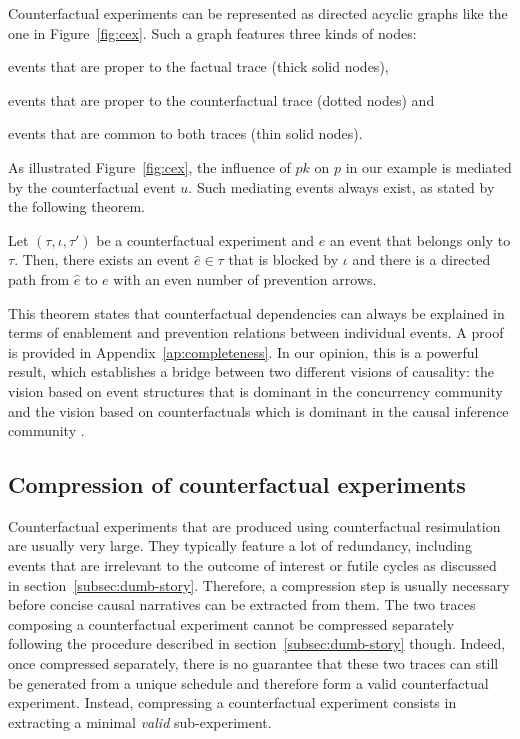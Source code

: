 Counterfactual experiments can be represented as directed acyclic
graphs like the one in Figure~\ref{fig:cex}. Such a graph features
three kinds of nodes:
\begin{inparaenum}[]
\item events that are proper to the factual trace (thick solid nodes),
\item events that are proper to the counterfactual trace (dotted
  nodes) and
\item events that are common to both traces (thin solid nodes).
\end{inparaenum}


As illustrated Figure~\ref{fig:cex}, the influence of $pk$ on $p$ in
our example is mediated by the counterfactual event $u$. Such
mediating events always exist, as stated by the following theorem.

\begin{theorem}
  \label{thm:completeness}
  Let $(\tau, \iota, \tau')$ be a counterfactual experiment and $e$ an
  event that belongs only to $\tau$. Then, there exists an event
  $\hat e \in \tau$ that is blocked by $\iota$ and there is a directed
  path from $\hat e$ to $e$ with an even number of prevention arrows.
\end{theorem}
\noindent This theorem states that counterfactual dependencies can
always be explained in terms of enablement and prevention relations
between individual events. A proof is provided in
Appendix~\ref{ap:completeness}. In our opinion, this is a powerful
result, which establishes a bridge between two different visions of
causality: the vision based on event structures
\cite{winskel1986event} that is dominant in the concurrency community
and the vision based on counterfactuals which is dominant in the
causal inference community \cite{pearl2009causality}.

\subsection{Compression of counterfactual experiments}

Counterfactual experiments that are produced using counterfactual
resimulation are usually very large. They typically feature a lot of
redundancy, including events that are irrelevant to the outcome of
interest or futile cycles as discussed in
section~\ref{subsec:dumb-story}. Therefore, a compression step is
usually necessary before concise causal narratives can be extracted
from them. The two traces composing a counterfactual experiment cannot
be compressed separately following the procedure described in
section~\ref{subsec:dumb-story} though. Indeed, once compressed
separately, there is no guarantee that these two traces can still be
generated from a unique schedule and therefore form a valid
counterfactual experiment. Instead, compressing a
counterfactual experiment consists in extracting a minimal \emph{valid}
sub-experiment.


